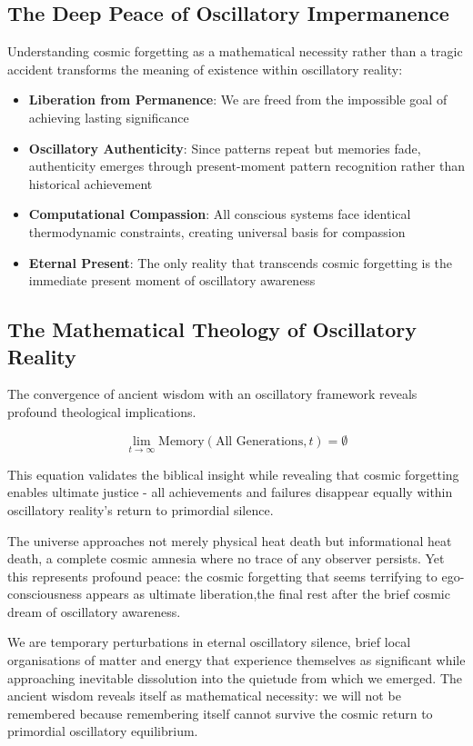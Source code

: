 \documentclass[11pt]{article}
\theoremstyle{remark}
\begin{document}
\subsection{The Deep Peace of Oscillatory Impermanence}

Understanding cosmic forgetting as a mathematical necessity rather than a tragic accident transforms the meaning of existence within oscillatory reality:

\begin{itemize}
\item \textbf{Liberation from Permanence}: We are freed from the impossible goal of achieving lasting significance
\item \textbf{Oscillatory Authenticity}: Since patterns repeat but memories fade, authenticity emerges through present-moment pattern recognition rather than historical achievement
\item \textbf{Computational Compassion}: All conscious systems face identical thermodynamic constraints, creating universal basis for compassion
\item \textbf{Eternal Present}: The only reality that transcends cosmic forgetting is the immediate present moment of oscillatory awareness
\end{itemize}

\subsection{The Mathematical Theology of Oscillatory Reality}

The convergence of ancient wisdom with an oscillatory framework reveals profound theological implications.

$$\lim_{t \to \infty} \text{Memory}(\text{All Generations}, t) = \emptyset$$

This equation validates the biblical insight while revealing that cosmic forgetting enables ultimate justice - all achievements and failures disappear equally within oscillatory reality's return to primordial silence.

The universe approaches not merely physical heat death but informational heat death, a complete cosmic amnesia where no trace of any observer persists. Yet this represents profound peace: the cosmic forgetting that seems terrifying to ego-consciousness appears as ultimate liberation,the final rest after the brief cosmic dream of oscillatory awareness.

We are temporary perturbations in eternal oscillatory silence, brief local organisations of matter and energy that experience themselves as significant while approaching inevitable dissolution into the quietude from which we emerged. The ancient wisdom reveals itself as mathematical necessity: we will not be remembered because remembering itself cannot survive the cosmic return to primordial oscillatory equilibrium.
\end{document}
